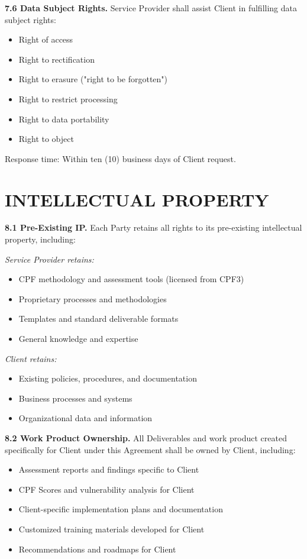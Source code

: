 \documentclass[11pt,a4paper]{article}
\begin{document}
\textbf{7.6 Data Subject Rights.} Service Provider shall assist Client in fulfilling data subject rights:
\begin{itemize}
\item Right of access
\item Right to rectification
\item Right to erasure ("right to be forgotten")
\item Right to restrict processing
\item Right to data portability
\item Right to object
\end{itemize}

Response time: Within ten (10) business days of Client request.

\section{INTELLECTUAL PROPERTY}

\textbf{8.1 Pre-Existing IP.} Each Party retains all rights to its pre-existing intellectual property, including:

\textit{Service Provider retains:}
\begin{itemize}
\item CPF methodology and assessment tools (licensed from CPF3)
\item Proprietary processes and methodologies
\item Templates and standard deliverable formats
\item General knowledge and expertise
\end{itemize}

\textit{Client retains:}
\begin{itemize}
\item Existing policies, procedures, and documentation
\item Business processes and systems
\item Organizational data and information
\end{itemize}

\textbf{8.2 Work Product Ownership.} All Deliverables and work product created specifically for Client under this Agreement shall be owned by Client, including:
\begin{itemize}
\item Assessment reports and findings specific to Client
\item CPF Scores and vulnerability analysis for Client
\item Client-specific implementation plans and documentation
\item Customized training materials developed for Client
\item Recommendations and roadmaps for Client
\end{itemize}
\end{document}
